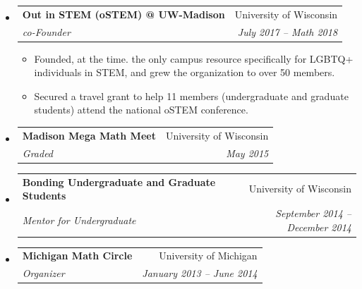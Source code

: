 \documentclass[letterpaper,11pt]{article}
\makeatletter
\newcommand{\resitem}[1]{\item #1 \vspace{-2pt}}
\newcommand{\ressubheading}[4]{
\begin{tabular*}{6.5in}[t]{l@{\cftdotfill{\cftsecdotsep}\extracolsep{\fill}}r}
		\textbf{#1} & #2 \\
		\textit{#3} & \textit{#4} \\
\end{tabular*}\vspace{-6pt}}
\makeatother
\begin{document}
\begin{itemize}
\item 
	\ressubheading{Out in STEM (oSTEM) @ UW-Madison}{University of Wisconsin}{co-Founder}{July 2017 -- Math 2018}
	\begin{itemize}
		\resitem{Founded, at the time. the only campus resource specifically for LGBTQ+ individuals in STEM, and grew the organization to over 50 members.}
		\resitem{Secured a travel grant to help 11 members (undergraduate and graduate students) attend the national oSTEM conference.}
		\end{itemize}

%	
\item 
	\ressubheading{Madison Mega Math Meet}{University of Wisconsin}{Graded}{May 2015}
	
\item 
	\ressubheading{Bonding Undergraduate and Graduate Students}{University of Wisconsin}{Mentor for Undergraduate}{September 2014 -- December 2014}

\item 
	\ressubheading{Michigan Math Circle}{University of Michigan}{Organizer}{January 2013 -- June 2014}
	

\end{itemize}
\end{document}

